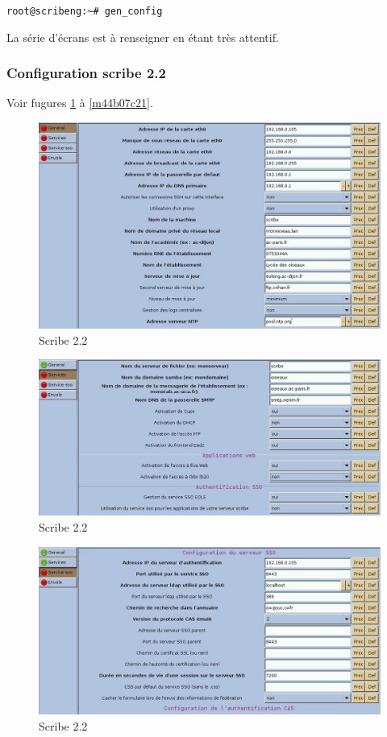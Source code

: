 \documentclass{article}
\makeatletter
\def\maxwidth{\ifdim\Gin@nat@width>\linewidth\linewidth
\else\Gin@nat@width\fi}
\let\Oldincludegraphics\includegraphics
\renewcommand{\includegraphics}[1]{\Oldincludegraphics[width=\maxwidth]{#1}}
\makeatother
\begin{document}
\lstinline!root@scribeng:~# gen_config!

La série d'écrans est à renseigner en étant très attentif.

\subsubsection{Configuration scribe 2.2}

Voir fugures \ref{m4d52829f} à \ref{m44b07c21}.

\begin{figure}[htbp]
\centering
\includegraphics{scribe_html_m4d52829f.jpg}
\caption{Scribe 2.2 \label{m4d52829f}}
\end{figure}

\begin{figure}[htbp]
\centering
\includegraphics{scribe_html_1f004f88.jpg}
\caption{Scribe 2.2}
\end{figure}

\begin{figure}[htbp]
\centering
\includegraphics{scribe_html_m5ada8c94.jpg}
\caption{Scribe 2.2}
\end{figure}
\end{document}
